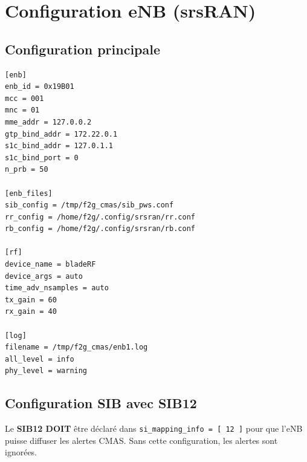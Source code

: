 \documentclass[11pt,a4paper]{article}
\begin{document}
\newpage

\section{Configuration eNB (srsRAN)}

\subsection{Configuration principale}

\begin{filebox}
\begin{lstlisting}[style=confstyle]
[enb]
enb_id = 0x19B01
mcc = 001
mnc = 01
mme_addr = 127.0.0.2
gtp_bind_addr = 172.22.0.1
s1c_bind_addr = 127.0.1.1
s1c_bind_port = 0
n_prb = 50

[enb_files]
sib_config = /tmp/f2g_cmas/sib_pws.conf
rr_config = /home/f2g/.config/srsran/rr.conf
rb_config = /home/f2g/.config/srsran/rb.conf

[rf]
device_name = bladeRF
device_args = auto
time_adv_nsamples = auto
tx_gain = 60
rx_gain = 40

[log]
filename = /tmp/f2g_cmas/enb1.log
all_level = info
phy_level = warning
\end{lstlisting}
\end{filebox}

\newpage

\subsection{Configuration SIB avec SIB12}

\begin{errorbox}
Le \textbf{SIB12 DOIT} être déclaré dans \texttt{si\_mapping\_info = [ 12 ]} pour que l'eNB puisse diffuser les alertes CMAS. Sans cette configuration, les alertes sont ignorées.
\end{errorbox}
\end{document}
